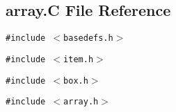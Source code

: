 \subsection{array.C File Reference}
\label{array.C}
{\tt \#include $<$basedefs.h$>$}\par
{\tt \#include $<$item.h$>$}\par
{\tt \#include $<$box.h$>$}\par
{\tt \#include $<$array.h$>$}\par
